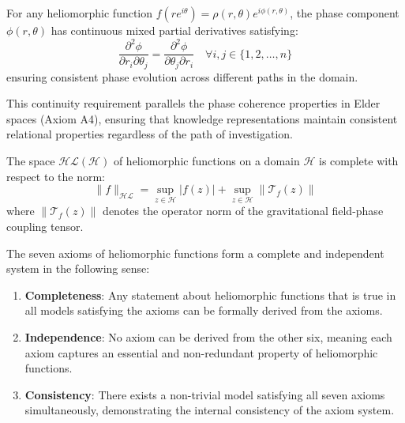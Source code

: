 \begin{axiom}
For any heliomorphic function $f(re^{i\theta}) = \rho(r,\theta)e^{i\phi(r,\theta)}$, the phase component $\phi(r,\theta)$ has continuous mixed partial derivatives satisfying:
\begin{equation}
\frac{\partial^2 \phi}{\partial r_i \partial \theta_j} = \frac{\partial^2 \phi}{\partial \theta_j \partial r_i} \quad \forall i,j \in \{1,2,\ldots,n\}
\end{equation}
ensuring consistent phase evolution across different paths in the domain.
\end{axiom}

\begin{remark}
This continuity requirement parallels the phase coherence properties in Elder spaces (Axiom A4), ensuring that knowledge representations maintain consistent relational properties regardless of the path of investigation.
\end{remark}

\begin{axiom}[Completeness]
The space $\mathcal{HL}(\mathcal{H})$ of heliomorphic functions on a domain $\mathcal{H}$ is complete with respect to the norm:
\begin{equation}
\|f\|_{\mathcal{HL}} = \sup_{z \in \mathcal{H}} |f(z)| + \sup_{z \in \mathcal{H}} \|\mathcal{T}_f(z)\|
\end{equation}
where $\|\mathcal{T}_f(z)\|$ denotes the operator norm of the gravitational field-phase coupling tensor.
\end{axiom}

\begin{theorem}
The seven axioms of heliomorphic functions form a complete and independent system in the following sense:
\begin{enumerate}
    \item \textbf{Completeness}: Any statement about heliomorphic functions that is true in all models satisfying the axioms can be formally derived from the axioms.
    
    \item \textbf{Independence}: No axiom can be derived from the other six, meaning each axiom captures an essential and non-redundant property of heliomorphic functions.
    
    \item \textbf{Consistency}: There exists a non-trivial model satisfying all seven axioms simultaneously, demonstrating the internal consistency of the axiom system.
\end{enumerate}
\end{theorem}

